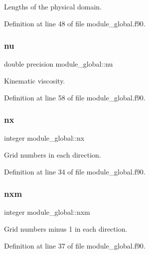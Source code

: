 Lengths of the physical domain. 



Definition at line 48 of file module\+\_\+global.\+f90.

\mbox{\label{namespacemodule__global_a43917539024b43bd2007b55a17813f70}} 
\subsubsection{\texorpdfstring{nu}{nu}}
{\footnotesize\ttfamily double precision module\+\_\+global\+::nu}



Kinematic viscosity. 



Definition at line 58 of file module\+\_\+global.\+f90.

\mbox{\label{namespacemodule__global_ab08f27937c57ba4ff61f3e468f1db2c4}} 
\subsubsection{\texorpdfstring{nx}{nx}}
{\footnotesize\ttfamily integer module\+\_\+global\+::nx}



Grid numbers in each direction. 



Definition at line 34 of file module\+\_\+global.\+f90.

\mbox{\label{namespacemodule__global_ae76c3b71a1e513d542e7c22fbba06dd5}} 
\subsubsection{\texorpdfstring{nxm}{nxm}}
{\footnotesize\ttfamily integer module\+\_\+global\+::nxm}



Grid numbers minus 1 in each direction. 



Definition at line 37 of file module\+\_\+global.\+f90.

